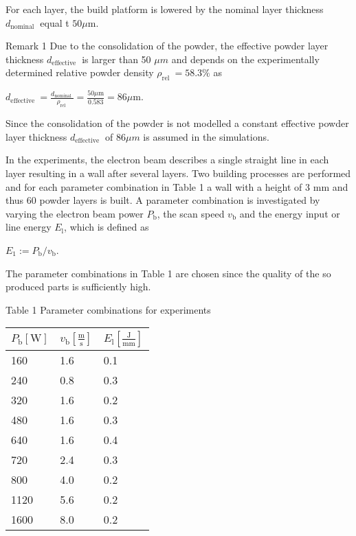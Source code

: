 \documentclass[10pt]{article}
\begin{document}
For each layer, the build platform is lowered by the nominal layer thickness $d_{\text {nominal }}$ equal t $50 \mu \mathrm{m}$.

Remark 1 Due to the consolidation of the powder, the effective powder layer thickness $d_{\text {effective }}$ is larger than 50 $\mu m$ and depends on the experimentally determined relative powder density $\rho_{\text {rel }}=58.3 \%$ as

$d_{\text {effective }}=\frac{d_{\text {nominal }}}{\rho_{\text {rel }}}=\frac{50 \mu \mathrm{m}}{0.583}=86 \mu \mathrm{m}$.

Since the consolidation of the powder is not modelled a constant effective powder layer thickness $d_{\text {effective }}$ of $86 \mu m$ is assumed in the simulations.

In the experiments, the electron beam describes a single straight line in each layer resulting in a wall after several layers. Two building processes are performed and for each parameter combination in Table 1 a wall with a height of 3 $\mathrm{mm}$ and thus 60 powder layers is built. A parameter combination is investigated by varying the electron beam power $P_{\mathrm{b}}$, the scan speed $v_{\mathrm{b}}$ and the energy input or line energy $E_{\mathrm{l}}$, which is defined as

$E_{1}:=P_{\mathrm{b}} / v_{\mathrm{b}}$.

The parameter combinations in Table 1 are chosen since the quality of the so produced parts is sufficiently high.

Table 1 Parameter combinations for experiments

\begin{center}
\begin{tabular}{lll}
\hline
$P_{\mathrm{b}}[\mathrm{W}]$ & $v_{\mathrm{b}}\left[\frac{\mathrm{m}}{\mathrm{s}}\right]$ & $E_{\mathrm{l}}\left[\frac{\mathrm{J}}{\mathrm{mm}}\right]$ \\
\hline
160 & 1.6 & 0.1 \\
240 & 0.8 & 0.3 \\
320 & 1.6 & 0.2 \\
480 & 1.6 & 0.3 \\
640 & 1.6 & 0.4 \\
720 & 2.4 & 0.3 \\
800 & 4.0 & 0.2 \\
1120 & 5.6 & 0.2 \\
1600 & 8.0 & 0.2 \\
\hline
\end{tabular}
\end{center}
\end{document}
